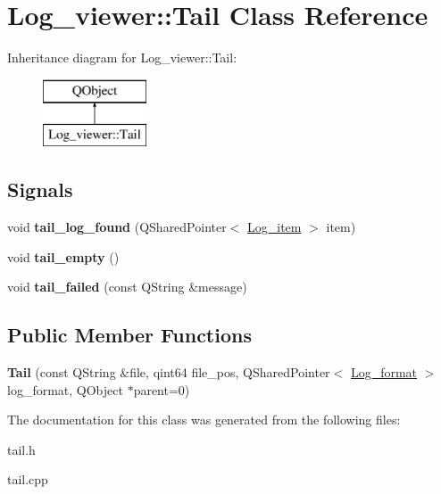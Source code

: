 \hypertarget{class_log__viewer_1_1_tail}{\section{Log\-\_\-viewer\-:\-:Tail Class Reference}
\label{class_log__viewer_1_1_tail}
}
Inheritance diagram for Log\-\_\-viewer\-:\-:Tail\-:\begin{figure}[H]
\begin{center}
\leavevmode
\includegraphics[height=2.000000cm]{class_log__viewer_1_1_tail}
\end{center}
\end{figure}
\subsection*{Signals}
\begin{DoxyCompactItemize}
\item 
\hypertarget{class_log__viewer_1_1_tail_a2ce362f9469de5b705b3960b2ebc833e}{void {\bfseries tail\-\_\-log\-\_\-found} (Q\-Shared\-Pointer$<$ \hyperlink{class_log__viewer_1_1_log__item}{Log\-\_\-item} $>$ item)}\label{class_log__viewer_1_1_tail_a2ce362f9469de5b705b3960b2ebc833e}

\item 
\hypertarget{class_log__viewer_1_1_tail_ab6786e71e42cb38307eeb1dc8cd42568}{void {\bfseries tail\-\_\-empty} ()}\label{class_log__viewer_1_1_tail_ab6786e71e42cb38307eeb1dc8cd42568}

\item 
\hypertarget{class_log__viewer_1_1_tail_ae5ccb520db28b8d0cbdce0058fb02186}{void {\bfseries tail\-\_\-failed} (const Q\-String \&message)}\label{class_log__viewer_1_1_tail_ae5ccb520db28b8d0cbdce0058fb02186}

\end{DoxyCompactItemize}
\subsection*{Public Member Functions}
\begin{DoxyCompactItemize}
\item 
\hypertarget{class_log__viewer_1_1_tail_a2594843c80c46319b34897ffe664fde1}{{\bfseries Tail} (const Q\-String \&file, qint64 file\-\_\-pos, Q\-Shared\-Pointer$<$ \hyperlink{class_log__viewer_1_1_log__format}{Log\-\_\-format} $>$ log\-\_\-format, Q\-Object $\ast$parent=0)}\label{class_log__viewer_1_1_tail_a2594843c80c46319b34897ffe664fde1}

\end{DoxyCompactItemize}


The documentation for this class was generated from the following files\-:\begin{DoxyCompactItemize}
\item 
tail.\-h\item 
tail.\-cpp\end{DoxyCompactItemize}
